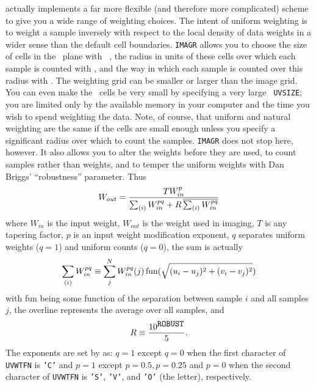      {\tt {}} actually implements a far more flexible (and
therefore more complicated) scheme to give you a wide range of
weighting choices.  The intent of uniform weighting is to weight a
sample inversely with respect to the local density of data weights in
a wider sense than the default cell boundaries.  {\tt IMAGR} allows
you to choose the size of cells in the \uv\ plane with {\tt
{}}, the radius in units of these cells over which each
sample is counted with {\tt {}}, and the way in which each
sample is counted over this radius with {\tt {}}\@.  The
weighting grid can be smaller or larger than the image grid.  You can
even make the \uv\ cells be very small by specifying a very large {\tt
UVSIZE}; you are limited only by the available memory in your computer
and the time you wish to spend weighting the data.  Note, of course,
that uniform and natural weighting are the same if the cells are small
enough unless you specify a significant radius over which to count the
samples. {\tt IMAGR} does not stop here, however.  It also allows you
to alter the weights before they are used, to count samples rather
than weights, and to temper the uniform weights with Dan Briggs'
``robustness'' parameter.  Thus
$$
   W_{out} = {{T W_{in}^p}\over{\sum_{(i)}W_{in}^{pq} +
                         R\, \overline{\sum_{(i)}W_{in}^{pq}}}}
$$
where $W_{in}$ is the input weight, $W_{out}$ is the weight used in
imaging, $T$ is any tapering factor, $p$ is an input weight
modification exponent, $q$ separates uniform weights ($q = 1$) and
uniform counts ($q = 0$), the sum is actually
$$
\sum_{(i)}W_{in}^{pq} \equiv \sum_j^N W_{in}^{pq}(j)\,
         \hbox{fun}(\sqrt{(u_i-u_j)^2+(v_i-v_j)^2})
$$
with fun being some function of the separation between sample $i$ and
all samples $j$, the overline represents the average over all samples,
and
$$
      R \equiv {{10^{\hbox{{\tt ROBUST}}}}\over 5}.
$$
The exponents are set by {\tt {}} as: $q = 1$ except $q =
0$ when the first character of {\tt UVWTFN} is {\tt 'C'} and $p = 1$
except $p = 0.5 , p = 0.25$ and $p = 0$ when the second character of
{\tt UVWTFN} is {\tt 'S'}, {\tt 'V'}, and {\tt 'O'} (the letter),
respectively.

